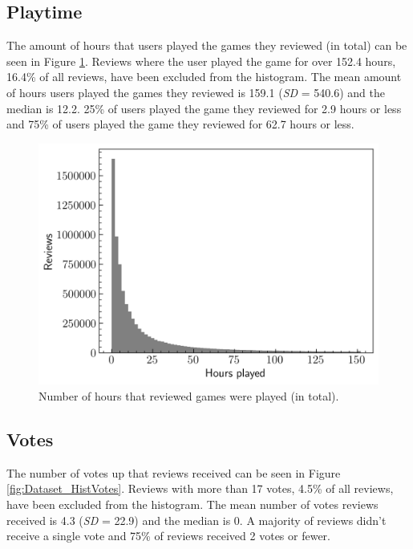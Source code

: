 \subsection{Playtime} \label{sec:Dataset_Reviews_PT}

The amount of hours that users played the games they reviewed (in total) can be seen in Figure \ref{fig:Dataset_HistPlaytimes}. Reviews where the user played the game for over 152.4 hours, 16.4\% of all reviews, have been excluded from the histogram. The mean amount of hours users played the games they reviewed is 159.1 (\textit{SD} = 540.6) and the median is 12.2. 25\% of users played the game they reviewed for 2.9 hours or less and 75\% of users played the game they reviewed for 62.7 hours or less.

\begin{figure}[ht]
    \centering
    \includegraphics[scale=0.55]{figures/03_dataset/10_hist_review_playtimes.png}
    \caption{Number of hours that reviewed games were played (in total).}
    \label{fig:Dataset_HistPlaytimes}
\end{figure}

\subsection{Votes} \label{sec:Dataset_Reviews_V}

The number of votes up that reviews received can be seen in Figure \ref{fig:Dataset_HistVotes}. Reviews with more than 17 votes, 4.5\% of all reviews, have been excluded from the histogram. The mean number of votes reviews received is 4.3 (\textit{SD} = 22.9) and the median is 0. A majority of reviews didn't receive a single vote and 75\% of reviews received 2 votes or fewer.

